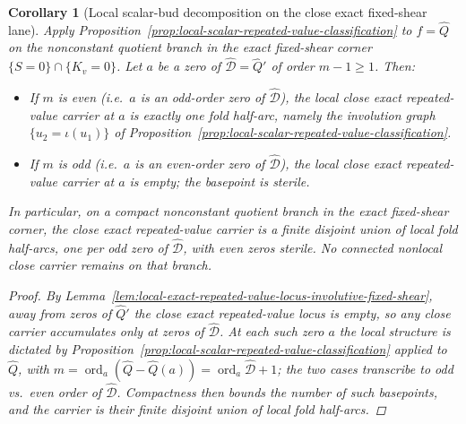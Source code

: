 \documentclass[11pt,a4paper]{amsart}
\theoremstyle{plain}
\newtheorem{corollary}[theorem]{Corollary}
\theoremstyle{definition}
\begin{document}
\begin{corollary}[Local scalar-bud decomposition on the close exact fixed-shear lane]
\label{cor:local-scalar-bud-decomposition-close-fixed-shear}
Apply
Proposition~\ref{prop:local-scalar-repeated-value-classification} to
$f=\widehat Q$ on the nonconstant quotient branch in the exact fixed-shear
corner $\{S=0\}\cap\{K_v=0\}$. Let $a$ be a zero of
$\widehat{\mathcal D}=\widehat Q'$ of order $m-1\ge 1$. Then:
\begin{itemize}
\item If $m$ is even (i.e.\ $a$ is an odd-order zero of $\widehat{\mathcal D}$),
the local close exact repeated-value carrier at $a$ is exactly one fold
half-arc, namely the involution graph $\{u_2=\iota(u_1)\}$ of
Proposition~\ref{prop:local-scalar-repeated-value-classification}.
\item If $m$ is odd (i.e.\ $a$ is an even-order zero of $\widehat{\mathcal D}$),
the local close exact repeated-value carrier at $a$ is empty; the basepoint is
sterile.
\end{itemize}
In particular, on a compact nonconstant quotient branch in the exact
fixed-shear corner, the close exact repeated-value carrier is a finite
disjoint union of local fold half-arcs, one per odd zero of
$\widehat{\mathcal D}$, with even zeros sterile. No connected nonlocal close
carrier remains on that branch.

\begin{proof}
By
Lemma~\ref{lem:local-exact-repeated-value-locus-involutive-fixed-shear}, away
from zeros of $\widehat Q'$ the close exact repeated-value locus is empty, so
any close carrier accumulates only at zeros of $\widehat{\mathcal D}$. At each
such zero $a$ the local structure is dictated by
Proposition~\ref{prop:local-scalar-repeated-value-classification} applied to
$\widehat Q$, with $m=\operatorname{ord}_a(\widehat Q-\widehat Q(a))
=\operatorname{ord}_a\widehat{\mathcal D}+1$; the two cases transcribe to odd
vs.\ even order of $\widehat{\mathcal D}$. Compactness then bounds the number
of such basepoints, and the carrier is their finite disjoint union of local
fold half-arcs.
\end{proof}
\end{corollary}
\end{document}
